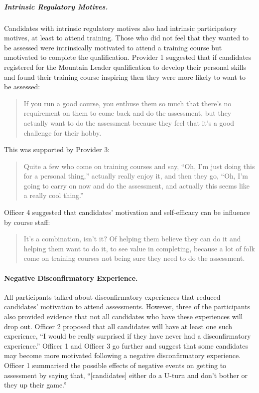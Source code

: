 \documentclass[
  12pt,
  a4paper,
]{book}
\begin{document}
\hypertarget{intrinsic-regulatory-motives.}{%
\subparagraph{Intrinsic Regulatory Motives.}\label{intrinsic-regulatory-motives.}}

Candidates with intrinsic regulatory motives also had intrinsic participatory motives, at least to attend training. Those who did not feel that they wanted to be assessed were intrinsically motivated to attend a training course but amotivated to complete the qualification. Provider 1 suggested that if candidates registered for the Mountain Leader qualification to develop their personal skills and found their training course inspiring then they were more likely to want to be assessed:

\begin{quote}
If you run a good course, you enthuse them so much that there's no requirement on them to come back and do the assessment, but they actually want to do the assessment because they feel that it's a good challenge for their hobby.
\end{quote}

This was supported by Provider 3:

\begin{quote}
Quite a few who come on training courses and say, ``Oh, I'm just doing this for a personal thing,'' actually really enjoy it, and then they go, ``Oh, I'm going to carry on now and do the assessment, and actually this seems like a really cool thing.''
\end{quote}

Officer 4 suggested that candidates' motivation and self-efficacy can be influence by course staff:

\begin{quote}
It's a combination, isn't it? Of helping them believe they can do it and helping them want to do it, to see value in completing, because a lot of folk come on training courses not being sure they need to do the assessment.
\end{quote}

\hypertarget{negative-disconfirmatory-experience.}{%
\paragraph{Negative Disconfirmatory Experience.}\label{negative-disconfirmatory-experience.}}

All participants talked about disconfirmatory experiences that reduced candidates' motivation to attend assessments. However, three of the participants also provided evidence that not all candidates who have these experiences will drop out. Officer 2 proposed that all candidates will have at least one such experience, ``I would be really surprised if they have never had a disconfirmatory experience.'' Officer 1 and Officer 3 go further and suggest that some candidates may become more motivated following a negative disconfirmatory experience. Officer 1 summarised the possible effects of negative events on getting to assessment by saying that, ``{[}candidates{]} either do a U-turn and don't bother or they up their game.''
\end{document}
